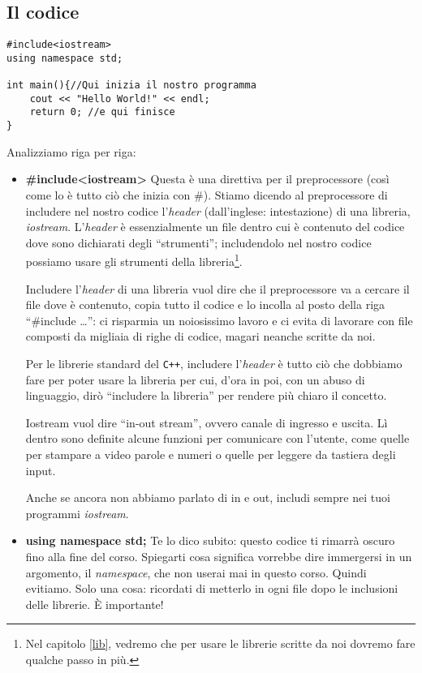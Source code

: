 \subsection{Il codice}
\begin{lstlisting}
#include<iostream>
using namespace std;

int main(){//Qui inizia il nostro programma
	cout << "Hello World!" << endl;
	return 0; //e qui finisce
}
\end{lstlisting}
Analizziamo riga per riga: 
\begin{itemize}


\item\textbf{\#include<iostream>} Questa è una direttiva per il preprocessore (così come lo è tutto ciò che inizia con \#). Stiamo dicendo al preprocessore di includere nel nostro codice l'\emph{header} (dall'inglese: intestazione) di una libreria, \emph{iostream}. L'\emph{header}  è essenzialmente un file dentro cui è contenuto del codice dove sono dichiarati degli ``strumenti''; includendolo nel nostro codice possiamo usare gli strumenti della libreria\footnote{Nel capitolo \ref{lib}, vedremo  che per usare le librerie scritte da noi dovremo fare qualche passo in più.}.

Includere l'\emph{header} di una libreria vuol dire che il preprocessore va a cercare il file dove è contenuto, copia tutto il codice e lo incolla al posto della riga ``\#include \ldots'': ci risparmia un noiosissimo lavoro e ci evita di lavorare con file composti da migliaia di righe di codice, magari neanche scritte da noi. 

Per le librerie standard del \verb|C++|, includere l'\emph{header} è tutto ciò che dobbiamo fare per poter usare la libreria per cui, d'ora in poi, con un abuso di linguaggio, dirò ``includere la libreria'' per rendere più chiaro il concetto.

Iostream vuol dire ``in-out stream'', ovvero canale di ingresso e uscita. Lì dentro sono definite alcune funzioni per comunicare con l'utente, come quelle per stampare a video parole e numeri o quelle per leggere da tastiera degli input. 

Anche se ancora non abbiamo parlato di in e out, includi sempre nei tuoi programmi \emph{iostream}.

\item\textbf{using namespace std;} Te lo dico subito: questo codice ti rimarrà oscuro fino alla fine del corso. Spiegarti cosa significa vorrebbe dire immergersi in un argomento, il \emph{namespace}, che non userai mai in questo corso. Quindi evitiamo. Solo una cosa: ricordati di metterlo in ogni file dopo le inclusioni delle librerie. È importante!



\end{itemize}
